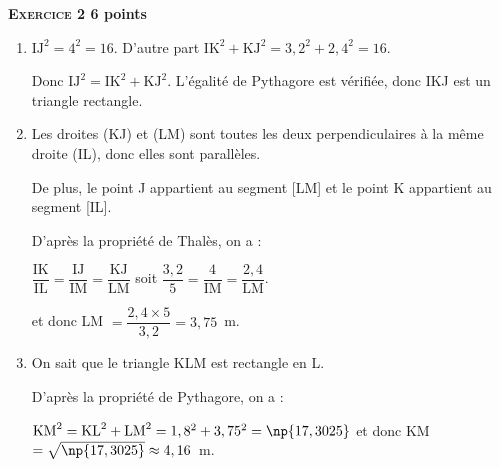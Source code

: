 \textbf{\textsc{Exercice 2} \hfill 6 points}

\medskip

\begin{enumerate}
\item $\text{IJ}^2 = 4^2 = 16$. D'autre part $\text{IK}^2 + \text{KJ}^2 = 3,2^2 + 2,4^2 = 16$.

Donc $\text{IJ}^2 = \text{IK}^2 + \text{KJ}^2$. L'égalité de Pythagore est vérifiée, donc IKJ est un triangle rectangle.
\item Les droites (KJ) et (LM) sont toutes les deux perpendiculaires à la même droite (IL), donc elles sont parallèles.

De plus, le point J appartient au segment [LM] et le point K appartient au segment [IL].

D'après la propriété de Thalès, on a :

$\dfrac{\text{IK}}{\text{IL}} =  \dfrac{\text{IJ}}{\text{IM}} =  \dfrac{\text{KJ}}{\text{LM}}$ soit  $\dfrac{3,2}{5} = \dfrac{4}{\text{IM}} =  \dfrac{2,4}{\text{LM}}$.

et donc LM $= \dfrac{2,4 \times 5}{3,2} = 3,75$~m.
\item On sait que le triangle KLM est rectangle en L.

D'après la propriété de Pythagore, on a : 

$\text{KM}^2 = \text{KL}^2 + \text{LM}^2 = 1,8^2 + 3,75^2 = \np{17,3025}$
et donc KM $=  \sqrt{\np{17,3025}} \approx  4,16$~m.
\end{enumerate}
 
\vspace{0,5cm}

